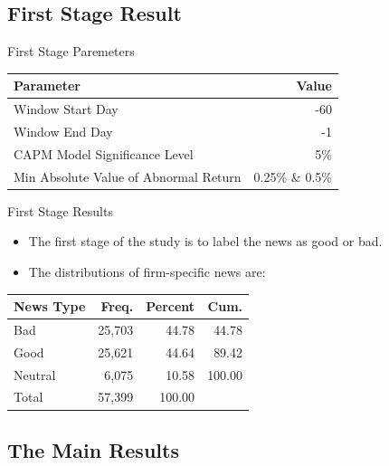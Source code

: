 \documentclass{beamer}
\begin{document}
\subsection{First Stage Result}

\begin{frame}{First Stage Paremeters}
    \centering
    \begin{tabular}{lr}
        \toprule
        Parameter                             & Value           \\
        \midrule
        Window Start Day                      & -60             \\
        Window End Day                        & -1              \\
        CAPM Model Significance Level         & 5\%             \\
        Min Absolute Value of Abnormal Return & 0.25\% \& 0.5\% \\
        \bottomrule
    \end{tabular}
\end{frame}

\begin{frame}{First Stage Results}
    \begin{itemize}
        \item The first stage of the study is to label the news as good or bad.
        \item The distributions of firm-specific news are:
    \end{itemize}
    \center
    \begin{tabular}{lrrr}
        \toprule
        News Type & Freq.  & Percent & Cum.   \\
        \midrule
        Bad       & 25,703 & 44.78   & 44.78  \\
        Good      & 25,621 & 44.64   & 89.42  \\
        Neutral   & 6,075  & 10.58   & 100.00 \\
        \midrule
        Total     & 57,399 & 100.00  &        \\
        \bottomrule
    \end{tabular}
\end{frame}


\subsection{The Main Results}
\end{document}
